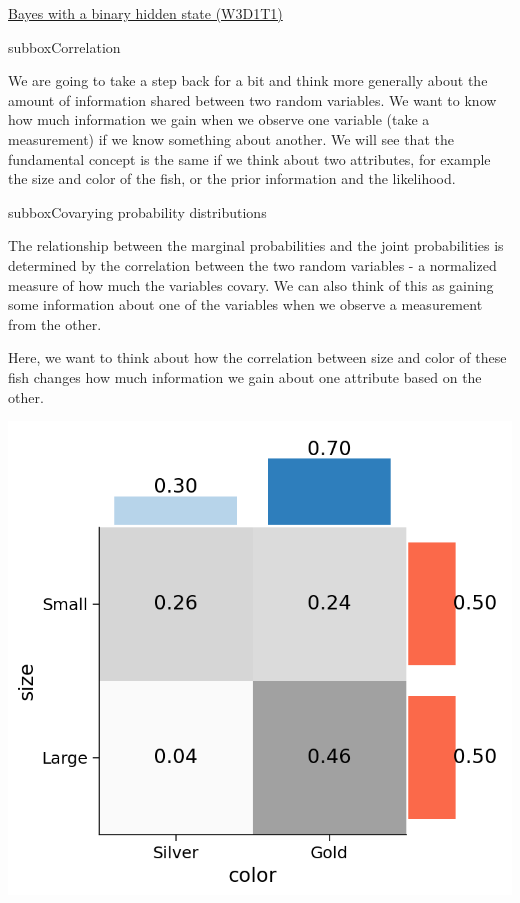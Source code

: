 \begin{textbox}{\href{https://compneuro.neuromatch.io/tutorials/W3D1_BayesianDecisions/student/W3D1_Tutorial1.html}{Bayes with a binary hidden state (W3D1T1)} }
\begin{subbox}{subbox}{Correlation}
\scriptsize

We are going to take a step back for a bit and think more generally about the amount of information shared between two random variables. We want to know how much information we gain when we observe one variable (take a measurement) if we know something about another. We will see that the fundamental concept is the same if we think about two attributes, for example the size and color of the fish, or the prior information and the likelihood.

\end{subbox}
\begin{subbox}{subbox}{Covarying probability distributions
}
\scriptsize

The relationship between the marginal probabilities and the joint probabilities is determined by the correlation between the two random variables - a normalized measure of how much the variables covary. We can also think of this as gaining some information about one of the variables when we observe a measurement from the other.  

Here, we want to think about how the correlation between size and color of these fish changes how much information we gain about one attribute based on the other. 

\centering
\includegraphics[scale=0.35]{Figures/BD/BD_Figure2.png}

\end{subbox}


\end{textbox}

